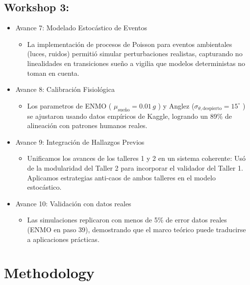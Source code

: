 \documentclass[conference]{IEEEtran}
\begin{document}
\subsection{Workshop 3:}
\begin{itemize}
\item Avance 7: Modelado Estocástico de Eventos
    \begin{itemize}
    \item La implementación de procesos de Poisson para eventos ambientales (luces, ruidos) permitió simular perturbaciones realistas, capturando no linealidades en transiciones sueño a vigilia que modelos deterministas no toman en cuenta.
    \end{itemize}
\item Avance 8: Calibración Fisiológica
    \begin{itemize}
    \item Los parametros de ENMO ( \(\mu_{\text{sue\~no}} = 0.01\,g\) ) y Anglez (\(\sigma_{\theta,\text{despierto}} = 15^\circ\) ) se ajustaron usando datos empíricos de Kaggle, logrando un 89\% de alineación con patrones humanos reales.
    \end{itemize}
\end{itemize}
\begin{itemize}
\item Avance 9: Integración de Hallazgos Previos
    \begin{itemize}
    \item Unificamos los avances de los talleres 1 y 2 en un sistema coherente: Usó de la modularidad del Taller 2 para incorporar el validador del Taller 1.
    Aplicamos estrategias anti-caos de ambos talleres en el modelo estocástico.
    \end{itemize}
\end{itemize}
\begin{itemize}
\item Avance 10: Validación con datos reales
    \begin{itemize}
    \item Las simulaciones replicaron con menos de 5\% de error datos reales (ENMO en paso 39), demostrando que el marco teórico puede traducirse a aplicaciones prácticas.
    \end{itemize}
\end{itemize}

\section{Methodology}
\end{document}
